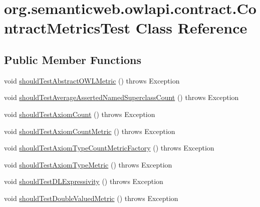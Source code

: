 \hypertarget{classorg_1_1semanticweb_1_1owlapi_1_1contract_1_1_contract_metrics_test}{\section{org.\-semanticweb.\-owlapi.\-contract.\-Contract\-Metrics\-Test Class Reference}
\label{classorg_1_1semanticweb_1_1owlapi_1_1contract_1_1_contract_metrics_test}
}
\subsection*{Public Member Functions}
\begin{DoxyCompactItemize}
\item 
void \hyperlink{classorg_1_1semanticweb_1_1owlapi_1_1contract_1_1_contract_metrics_test_affa7b1fb30f15cd6d58c047691f4aabd}{should\-Test\-Abstract\-O\-W\-L\-Metric} ()  throws Exception 
\item 
void \hyperlink{classorg_1_1semanticweb_1_1owlapi_1_1contract_1_1_contract_metrics_test_a1ac93f62c8a1d8d8ee08d145fb45b80c}{should\-Test\-Average\-Asserted\-Named\-Superclass\-Count} ()  throws Exception 
\item 
void \hyperlink{classorg_1_1semanticweb_1_1owlapi_1_1contract_1_1_contract_metrics_test_afb8222d4d3269d4911500d9d18f17489}{should\-Test\-Axiom\-Count} ()  throws Exception 
\item 
void \hyperlink{classorg_1_1semanticweb_1_1owlapi_1_1contract_1_1_contract_metrics_test_a30970496338faf0a0322ac4115a6f971}{should\-Test\-Axiom\-Count\-Metric} ()  throws Exception 
\item 
void \hyperlink{classorg_1_1semanticweb_1_1owlapi_1_1contract_1_1_contract_metrics_test_ae05d4e8d550f5c70e660054b8e4cded0}{should\-Test\-Axiom\-Type\-Count\-Metric\-Factory} ()  throws Exception 
\item 
void \hyperlink{classorg_1_1semanticweb_1_1owlapi_1_1contract_1_1_contract_metrics_test_a72fb08315db5a26d466b77a9142d7af1}{should\-Test\-Axiom\-Type\-Metric} ()  throws Exception 
\item 
void \hyperlink{classorg_1_1semanticweb_1_1owlapi_1_1contract_1_1_contract_metrics_test_a1b2c054c61fff8d88bf73073ea36008f}{should\-Test\-D\-L\-Expressivity} ()  throws Exception 
\item 
void \hyperlink{classorg_1_1semanticweb_1_1owlapi_1_1contract_1_1_contract_metrics_test_a14502b82a10b78154504863937eae1d5}{should\-Test\-Double\-Valued\-Metric} ()  throws Exception 

\end{DoxyCompactItemize}

